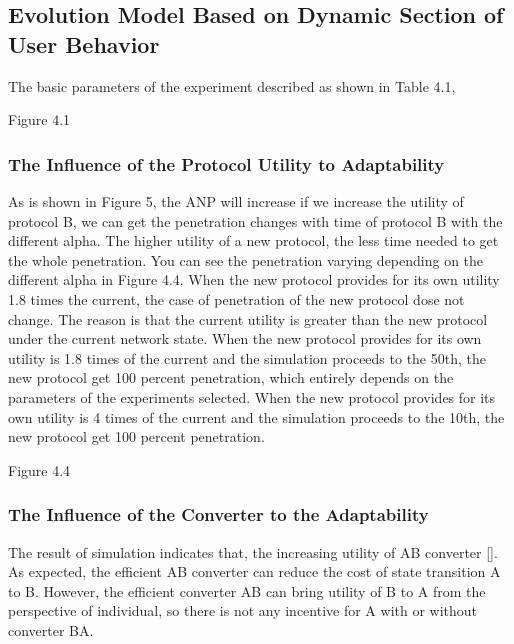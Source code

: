 \documentclass{article}
\begin{document}
\subsection{Evolution Model Based on Dynamic Section of User Behavior}
The basic parameters of the experiment described as shown in Table 4.1,

Figure 4.1

\subsubsection{The Influence of the Protocol Utility to Adaptability}
As is shown in Figure 5, the ANP will increase if we increase the utility of protocol B, we can get the penetration
changes with time of protocol B with the different alpha. The higher utility of a new protocol, the less time needed to get
the whole penetration. You can see the penetration varying depending on the different alpha in Figure 4.4. When the new
protocol provides for its own utility 1.8 times the current, the case of penetration of the new protocol dose not change.
The reason is that the current utility is greater than the new protocol under the current network state. When the new
protocol provides for its own utility is 1.8 times of the current and the simulation proceeds to the 50th,  the new protocol
get 100 percent penetration, which entirely depends on the parameters of the experiments selected. When the new protocol
provides for its own utility is 4 times of the current and the simulation proceeds to the 10th, the new protocol get 100 percent penetration.

Figure 4.4

\subsubsection{The Influence of the Converter to the Adaptability}
The result of simulation indicates that, the increasing utility of AB converter []. As expected, the efficient AB
converter can reduce the cost of state transition A to B. However, the efficient converter AB can bring utility of B to A
from the perspective of individual, so there is not any incentive for A with or without converter BA.
\end{document}
